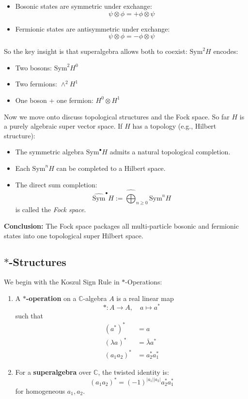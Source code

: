 \begin{itemize}
    \item Bosonic states are symmetric under exchange:
    \[
    \psi \otimes \phi = + \phi \otimes \psi
    \]
    \item Fermionic states are antisymmetric under exchange:
    \[
    \psi \otimes \phi = - \phi \otimes \psi
    \]
\end{itemize}

So the key insight is that superalgebra allows both to coexist: $\mathrm{Sym}^2 H$ encodes:
\begin{itemize}
    \item Two bosons: $\mathrm{Sym}^2 H^0$
    \item Two fermions: $\wedge^2 H^1$
    \item One boson + one fermion: $H^0 \otimes H^1$
\end{itemize}

Now we move onto discuss topological structures and the Fock space. So far $H$ is a purely algebraic super vector space. If $H$ has a topology (e.g., Hilbert structure):
\begin{itemize}
    \item The symmetric algebra $\mathrm{Sym}^\bullet H$ admits a natural topological completion.
    \item Each $\mathrm{Sym}^n H$ can be completed to a Hilbert space.
    \item The direct sum completion:
    \[
    \widehat{\mathrm{Sym}}^\bullet H := \widehat{\bigoplus}_{n \geq 0} \mathrm{Sym}^n H
    \]
    is called the \emph{Fock space}.
\end{itemize}

\textbf{Conclusion:} The Fock space packages all multi-particle bosonic and fermionic states into one topological super Hilbert space.

\subsection{$*$-Structures}

We begin with the Koszul Sign Rule in $*$-Operations:
\begin{definition}
\begin{enumerate}
    \item A \textbf{$*$-operation} on a $\mathbb{C}$-algebra $A$ is a real linear map
    \[
        * : A \to A, \quad a \mapsto a^*
    \]
    such that
    \begin{align*}
        (a^*)^* &= a \\
        (\lambda a)^* &= \bar{\lambda} a^* \\
        (a_1 a_2)^* &= a_2^* a_1^*
    \end{align*}
    \item For a \textbf{superalgebra} over $\mathbb{C}$, the twisted identity is:
    \[
        (a_1 a_2)^* = (-1)^{|a_1||a_2|} a_2^* a_1^*
    \]
    for homogeneous $a_1, a_2$.
\end{enumerate}
\end{definition}

